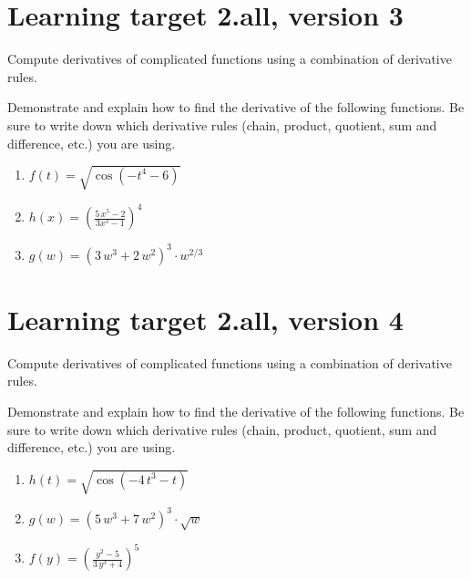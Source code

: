 \pagebreak

\section{Learning target 2.all, version 3}

Compute derivatives of complicated functions using a combination of derivative rules.

\hrulefill

Demonstrate and explain how to find the derivative of the following functions. Be sure to write down which derivative rules (chain, product, quotient, sum and difference, etc.) you are using.

\begin{enumerate}
    \item \(f(t) = \sqrt{\cos\left(-t^{4} - 6\right)}\)
    \vfill
    \item \(h(x) = \left( \frac{5 \, x^{5} - 2}{3 x^{3} - 1} \right)^{ 4 }\)
    \vfill
    \item \(g(w) = {\left(3 \, w^{3} + 2 \, w^{2}\right)}^{3} \cdot w^{2/3}\)
    \vfill
\end{enumerate}

\pagebreak

\section{Learning target 2.all, version 4}

Compute derivatives of complicated functions using a combination of derivative rules.

\hrulefill

Demonstrate and explain how to find the derivative of the following functions. Be sure to write down which derivative rules (chain, product, quotient, sum and difference, etc.) you are using.

\begin{enumerate}
    \item \(h(t) = \sqrt{\cos\left(-4 \, t^{3} - t\right)}\)
    \vfill
    \item \(g(w) = {\left(5 \, w^{3} + 7 \, w^{2}\right)}^{3} \cdot \sqrt{w}\)
    \vfill
    \item \(f(y) = \left(\frac{y^{2} - 5}{3 \, y^{3} + 4} \right)^{ 5 }\)
    \vfill
\end{enumerate}

\pagebreak

